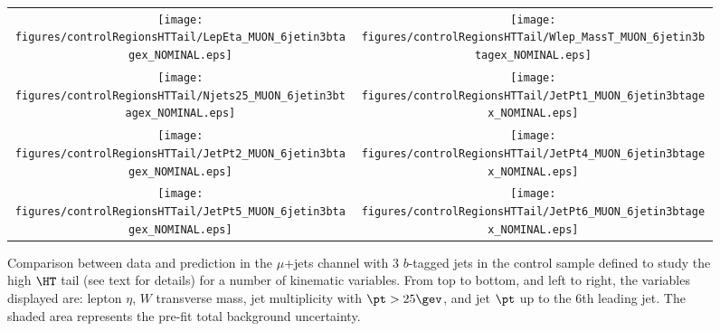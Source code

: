 \begin{figure}[htbp]
\begin{center}
\begin{tabular}{cc}
%
\texttt{[image: figures/controlRegionsHTTail/LepEta\_MUON\_6jetin3btagex\_NOMINAL.eps]} &
\texttt{[image: figures/controlRegionsHTTail/Wlep\_MassT\_MUON\_6jetin3btagex\_NOMINAL.eps]} \\
\texttt{[image: figures/controlRegionsHTTail/Njets25\_MUON\_6jetin3btagex\_NOMINAL.eps]} &
\texttt{[image: figures/controlRegionsHTTail/JetPt1\_MUON\_6jetin3btagex\_NOMINAL.eps]} \\
\texttt{[image: figures/controlRegionsHTTail/JetPt2\_MUON\_6jetin3btagex\_NOMINAL.eps]} &
\texttt{[image: figures/controlRegionsHTTail/JetPt4\_MUON\_6jetin3btagex\_NOMINAL.eps]} \\
\texttt{[image: figures/controlRegionsHTTail/JetPt5\_MUON\_6jetin3btagex\_NOMINAL.eps]} &
\texttt{[image: figures/controlRegionsHTTail/JetPt6\_MUON\_6jetin3btagex\_NOMINAL.eps]} \\
\end{tabular}\caption{\small {Comparison between data and prediction in the $\mu$+jets channel with 3 $b$-tagged jets in the control sample
defined to study the high $\HT$ tail (see text for details)  for a number of kinematic
variables. From top to bottom, and left to right, the variables displayed are: lepton $\eta$, $W$ transverse mass, jet multiplicity with $\pt>25\gev$, 
and jet $\pt$ up to the 6th leading jet.
The shaded area represents the pre-fit total background uncertainty.}}
\label{fig:MUON_controlHTTail_3btagex_2}
\end{center}
\end{figure}
